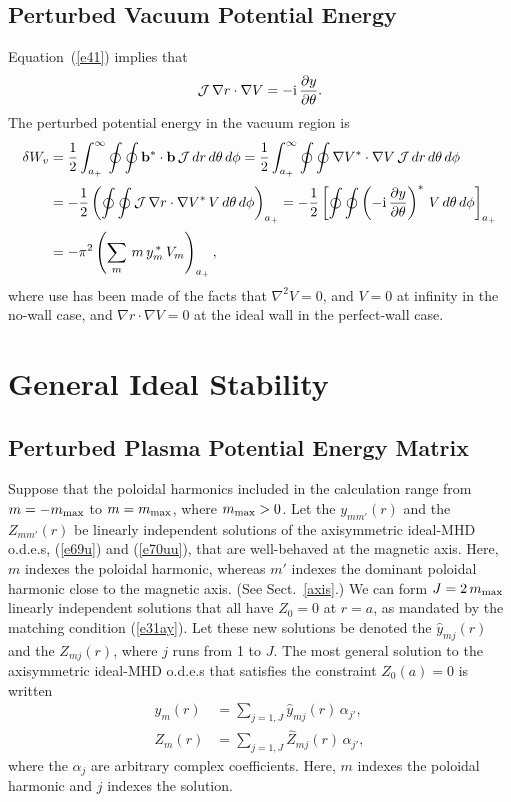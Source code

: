 \documentclass[12pt,prb,aps]{revtex4-1}
\begin{document}
\subsection{Perturbed Vacuum Potential Energy}
Equation~(\ref{e41}) implies that 
\begin{equation}
{\cal J} \,\nabla r\cdot\nabla V = - {\rm i}\,\frac{\partial y}{\partial \theta}.
\end{equation}
The perturbed potential energy in the vacuum region is\,\cite{tj1,gs1}
\begin{align}
\delta W_v &= \frac{1}{2}\int_{a_+}^\infty \oint\oint {\bf b}^\ast\cdot{\bf b}\,{\cal J}\,dr\,d\theta\,d\phi
=\frac{1}{2}\int_{a_+}^\infty \oint\oint \nabla V^\ast\cdot\nabla V\,{\cal J}\,dr\,d\theta\,d\phi\nonumber\\[0.5ex]
&= -\frac{1}{2}\left(\oint\oint {\cal J}\,\nabla r\cdot\nabla V^\ast\,V\,d\theta\,d\phi\right)_{a_+}
=-\frac{1}{2}\left[\oint\oint \left(-{\rm i}\,\frac{\partial y}{\partial \theta}\right)^\ast\,V\,d\theta\,d\phi\right]_{a_+}\nonumber\\[0.5ex]
&= - \pi^2\left(\sum_m\,m\,y_m^{\,\ast}\,V_m\right)_{a_+},\label{vac}
\end{align}
where use has been made of the facts that $\nabla^2 V =0$, and  $V=0$ at infinity in the no-wall case, and $\nabla r\cdot \nabla V=0$ at the ideal wall in the perfect-wall case. 

\section{General Ideal Stability}\label{ideal}

\subsection{Perturbed Plasma Potential Energy Matrix}\label{ideal1}
Suppose that the poloidal harmonics included in the calculation range from $m=-m_{\rm max}$ to $m=m_{\rm max}$, where $m_{\rm max} >0$. 
Let  the $y_{mm'}(r)$ and the $Z_{mm'}(r)$ be linearly independent solutions of the axisymmetric ideal-MHD o.d.e.s, (\ref{e69u}) and
(\ref{e70uu}), that are well-behaved at the magnetic axis. Here, $m$ indexes the poloidal harmonic, whereas $m'$ indexes the dominant poloidal harmonic close to the magnetic
axis. (See Sect.~\ref{axis}.)
We can form $J=2\,m_{\rm max}$ linearly independent solutions that all have $Z_0=0$ at $r=a$, as mandated by the matching condition (\ref{e31ay}). Let these
new solutions be denoted the $\hat{y}_{mj}(r)$ and the $Z_{mj}(r)$, where $j$ runs from 1 to $J$. 
The most general solution to the axisymmetric ideal-MHD o.d.e.s that satisfies the constraint $Z_0(a)=0$ is written
\begin{align}
y_m(r) &= \sum_{j=1,J} \hat{y}_{mj}(r)\,\alpha_{j'},\\[0.5ex]
Z_m(r)&= \sum_{j=1,J} \hat{Z}_{mj}(r)\,\alpha_{j'},
\end{align}
where the $\alpha_j$ are arbitrary complex coefficients. Here, $m$ indexes the poloidal harmonic and $j$ indexes the solution. 
 
\end{document}

